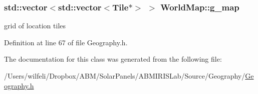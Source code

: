 \subsubsection[{g\+\_\+map}]{\setlength{\rightskip}{0pt plus 5cm}std\+::vector$<$std\+::vector$<${\bf Tile}$\ast$$>$ $>$ World\+Map\+::g\+\_\+map}\label{class_world_map_af3793bf3fcd5d16b5077fb07586f1dbb}
grid of location tiles 

Definition at line 67 of file Geography.\+h.



The documentation for this class was generated from the following file\+:\begin{DoxyCompactItemize}
\item 
/\+Users/wilfeli/\+Dropbox/\+A\+B\+M/\+Solar\+Panels/\+A\+B\+M\+I\+R\+I\+S\+Lab/\+Source/\+Geography/\hyperlink{_geography_8h}{Geography.\+h}\end{DoxyCompactItemize}
